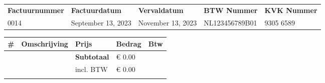 \documentclass{article}%
\begin{document}
\begin{minipage}{\textwidth}%
\flushleft%
\begin{tabularx}{\textwidth}{XXXXX}%
\textbf{Factuurnummer}&\textbf{Factuurdatum}&\textbf{Vervaldatum}&\textbf{BTW Nummer}&\textbf{KVK Nummer}\\%
0014&September 13, 2023&November 13, 2023&NL123456789B01&9305 6589\\%
\end{tabularx}%
\linebreak%
\linebreak%
\linebreak%
\linebreak%
\begin{tabularx}{\textwidth}{lXlll}%
\textbf{\#}&\textbf{Omschrijving}&\textbf{Prijs}&\textbf{Bedrag}&\textbf{Btw}\\%
\hline%
&&\textbf{Subtotaal}&€ 0.00&\\%
&&incl. BTW&€ 0.00 \\ \cline{3-4}&\\%
\end{tabularx}%
\end{minipage}%
\end{document}
